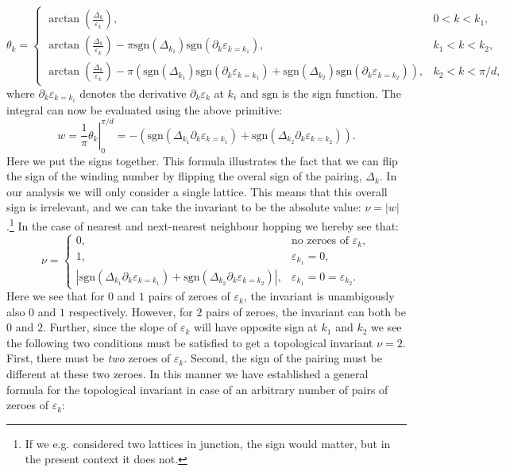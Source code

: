 \begin{equation}
\theta_k = \left\{ \begin{matrix} 
\arctan\left(\frac{\Delta_k}{\varepsilon_k}\right), & 0 < k < k_1, \\
\arctan\left(\frac{\Delta_k}{\varepsilon_k}\right) - \pi\text{sgn}(\Delta_{k_1})\text{sgn}\left(\partial_k\varepsilon_{k = k_1}\right), & k_1 < k < k_2, \\
\arctan\left(\frac{\Delta_k}{\varepsilon_k}\right) - \pi\left(\text{sgn}(\Delta_{k_1})\text{sgn}\left(\partial_k\varepsilon_{k = k_1}\right) + \text{sgn}(\Delta_{k_2})\text{sgn}\left(\partial_k\varepsilon_{k = k_2}\right)\right), & k_2 < k < \pi / d,
  \end{matrix} \right. \nonumber 
\end{equation}
where $\partial_k\varepsilon_{k = k_i}$ denotes the derivative $\partial_k\varepsilon_k$ at $k_i$ and $\text{sgn}$ is the sign function. The integral can now be evaluated using the above primitive:
\begin{equation}
w = \left.\frac{1}{\pi}\theta_k\right|^{\pi / d}_{0} = -\left( \text{sgn}\left(\Delta_{k_1}\partial_k\varepsilon_{k = k_1}\right) + \text{sgn}\left(\Delta_{k_2}\partial_k\varepsilon_{k = k_2}\right) \right). \nonumber
\end{equation}
Here we put the signs together. This formula illustrates the fact that we can flip the sign of the winding number by flipping the overal sign of the pairing, $\Delta_k$. In our analysis we will only consider a single lattice. This means that this overall sign is irrelevant, and we can take the invariant to be the absolute value: $\nu = |w|$.\footnote{If we e.g. considered two lattices in junction, the sign would matter, but in the present context it does not.} In the case of nearest and next-nearest neighbour hopping we hereby see that:
\begin{equation}
\nu = \left\{ \begin{matrix} 	0, 								& \text{no zeroes of } \varepsilon_k, \\
								1, 								& \varepsilon_{k_1} = 0, \\
								\left|\text{sgn}(\Delta_{k_1}\partial_k\varepsilon_{k = k_1}) + \text{sgn}(\Delta_{k_2}\partial_k\varepsilon_{k = k_2})\right|,   & \varepsilon_{k_1} = 0 = \varepsilon_{k_2}.
\end{matrix} \right. \nonumber
\end{equation}
Here we see that for $0$ and $1$ pairs of zeroes of $\varepsilon_k$, the invariant is unambigously also $0$ and $1$ respectively. However, for $2$ pairs of zeroes, the invariant can both be $0$ and $2$. Further, since the slope of $\varepsilon_k$ will have opposite sign at $k_1$ and $k_2$ we see the following two conditions must be satisfied to get a topological invariant $\nu = 2$. First, there must be \textit{two} zeroes of $\varepsilon_k$. Second, the sign of the pairing must be different at these two zeroes. In this manner we have established a general formula for the topological invariant in case of an arbitrary number of pairs of zeroes of $\varepsilon_k$:
